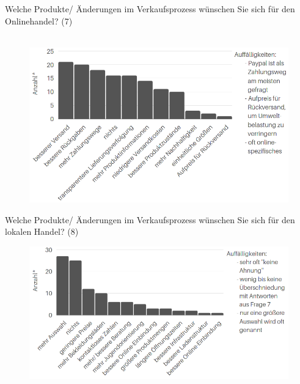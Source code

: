 \newpage\noindent Welche Produkte/ Änderungen im Verkaufsprozess wünschen Sie sich für den Onlinehandel? (7)\\\\

\begin{figure}[H]
    \begin{center}
        \includegraphics[width=15cm]{media/schuelerumfrage/7.png} 
    \end{center}
\end{figure}

\noindent Welche Produkte/ Änderungen im Verkaufsprozess wünschen Sie sich für den lokalen Handel? (8)\\
\begin{figure}[H]
    \begin{center}
        \includegraphics[width=15cm]{media/schuelerumfrage/8.png}
    \end{center} 
\end{figure}
